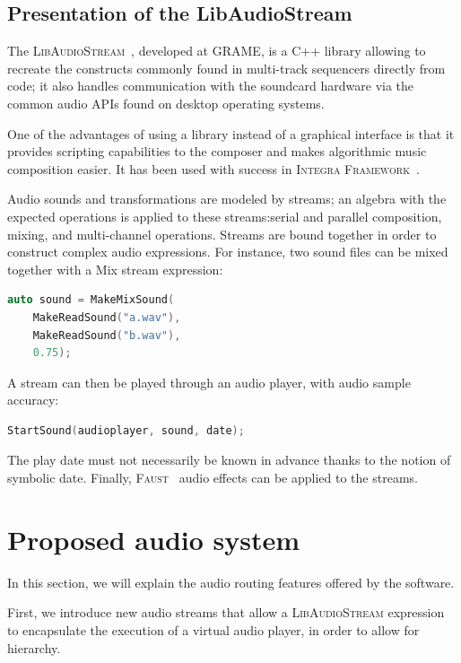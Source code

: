 \documentclass{article}
\newcommand*{\LibAudioStream}{\textsc{LibAudioStream}\xspace}
\newcommand*{\openmusic}{\textsc{Integra Framework}\xspace}
\newcommand*{\faust}{\textsc{Faust}\xspace}
\begin{document}
\subsection{Presentation of the LibAudioStream}
The \LibAudioStream~\cite{letzlibaudiostream}, developed at GRAME, is a C++ library allowing to recreate the constructs commonly found in multi-track sequencers directly from code; it also handles communication with the soundcard hardware via the common audio APIs found on desktop operating systems.

One of the advantages of using a library instead of a graphical interface is that it provides scripting capabilities to the composer and makes algorithmic music composition easier.
It has been used with success in \openmusic~\cite{bouche2014programmation}.

Audio sounds and transformations are modeled by streams; an algebra with the expected operations is applied to these streams:serial and parallel composition, mixing, and multi-channel operations.
Streams are bound together in order to construct complex audio expressions.
For instance, two sound files can be mixed together with a Mix stream expression: 
\begin{lstlisting}[language=C++,columns=fullflexible,basicstyle=\ttfamily]
auto sound = MakeMixSound(
    MakeReadSound("a.wav"), 
    MakeReadSound("b.wav"), 
    0.75);
\end{lstlisting}
\newpage
A stream can then be played through an audio player, with audio sample accuracy:
 
\begin{lstlisting}[language=C++,columns=fullflexible,basicstyle=\ttfamily]
StartSound(audioplayer, sound, date);
\end{lstlisting}

The play date must not necessarily be known in advance thanks to the notion of symbolic date.
Finally, \faust~\cite{orlarey2009faust} audio effects can be applied to the streams.

\section{Proposed audio system}
In this section, we will explain the audio routing 
features offered by the software.

First, we introduce new audio streams that allow a \LibAudioStream
expression to encapsulate the execution of a virtual audio player, 
in order to allow for hierarchy.
\end{document}
